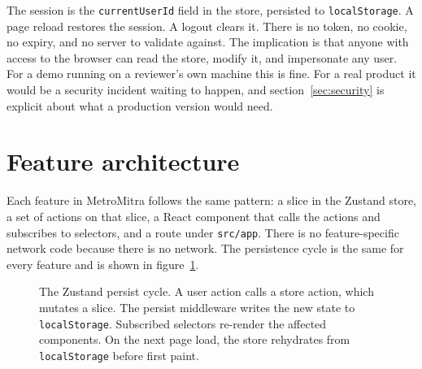 \documentclass[a4paper,11pt]{article}
\begin{document}
The session is the \texttt{currentUserId} field in the store, persisted to
\texttt{localStorage}. A page reload restores the session. A logout clears it.
There is no token, no cookie, no expiry, and no server to validate against.
The implication is that anyone with access to the browser can read the store,
modify it, and impersonate any user. For a demo running on a reviewer's own
machine this is fine. For a real product it would be a security incident
waiting to happen, and section~\ref{sec:security} is explicit about what a
production version would need.


\section{Feature architecture}

Each feature in MetroMitra follows the same pattern: a slice in the Zustand
store, a set of actions on that slice, a React component that calls the
actions and subscribes to selectors, and a route under \texttt{src/app}. There
is no feature-specific network code because there is no network. The
persistence cycle is the same for every feature and is shown in
figure~\ref{fig:flow}.

\begin{figure}[ht]
\centering
{}
\caption{The Zustand persist cycle. A user action calls a store action, which
mutates a slice. The persist middleware writes the new state to
\texttt{localStorage}. Subscribed selectors re-render the affected components.
On the next page load, the store rehydrates from \texttt{localStorage} before
first paint.}
\label{fig:flow}
\end{figure}
\end{document}
